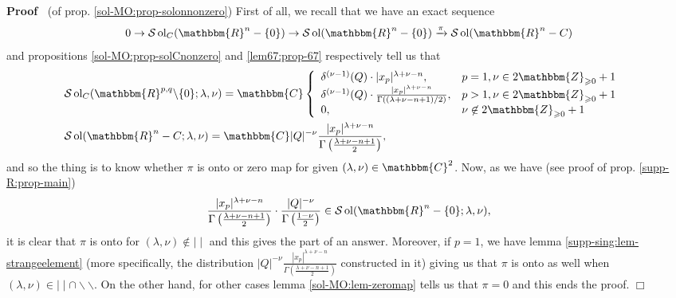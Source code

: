 \documentclass[12pt]{article}
\newcommand{\nin}{\not\in}
\newcommand{\tmop}[1]{\ensuremath{\operatorname{#1}}}
\renewenvironment{proof}{\noindent\textbf{Proof\ }}{\hspace*{\fill}$\Box$\medskip}
\theoremstyle{remark}
\begin{document}
\begin{proof}
  (of prop. \ref{sol-MO:prop-solonnonzero}) First of all, we recall that we
  have an exact sequence
  \[ 0 \rightarrow \mathcal{S} \tmop{ol}_C (\mathbbm{R}^n - \{ 0 \})
     \rightarrow \mathcal{S} \tmop{ol} (\mathbbm{R}^n - \{ 0 \})
     \xrightarrow{\pi} \mathcal{S} \tmop{ol} (\mathbbm{R}^n - C) \]
  and propositions \ref{sol-MO:prop-solCnonzero} and \ref{lem67:prop-67}
  respectively tell us that
  \begin{eqnarray}
    & \mathcal{S} \tmop{ol}_C (\mathbbm{R}^{p, q} \backslash \{ 0 \} ;
    \lambda, \nu) =\mathbbm{C} \left\{ \begin{array}{ll}
      \delta^{(\nu - 1)} (Q) \cdot | x_p |^{\lambda + \nu - n}, & p = 1, \nu
      \in 2\mathbbm{Z}_{\geqslant 0} + 1\\
      \delta^{(\nu - 1)} (Q) \cdot \frac{| x_p |^{\lambda + \nu - n}}{\Gamma
      ((\lambda + \nu - n + 1) / 2)}, & p > 1, \nu \in 2\mathbbm{Z}_{\geqslant
      0} + 1\\
      0, & \nu \nin 2\mathbbm{Z}_{\geqslant 0} + 1
    \end{array} \right. &  \nonumber\\
    & \mathcal{S} \tmop{ol} (\mathbbm{R}^n - C ; \lambda, \nu) =\mathbbm{C} |
    Q |^{- \nu} \frac{| x_p |^{\lambda + \nu - n}}{\Gamma \left( \frac{\lambda
    + \nu - n + 1}{2} \right)}, &  \nonumber
  \end{eqnarray}
  and so the thing is to know whether $\pi$ is onto or zero map for given
  $(\lambda, \nu) \in \mathbbm{C}^2$. Now, as we have (see proof of prop.
  \ref{supp-R:prop-main})
  \[ \frac{| x_p |^{\lambda + \nu - n}}{\Gamma \left( \frac{\lambda + \nu - n
     + 1}{2} \right)} \cdot \frac{| Q |^{- \nu}}{\Gamma \left( \frac{1 -
     \nu}{2} \right)} \in \mathcal{S} \tmop{ol} (\mathbbm{R}^n - \{ 0 \} ;
     \lambda, \nu), \]
  it is clear that $\pi$ is onto for $(\lambda, \nu) \nin \mid \mid$ and this
  gives the part of an answer. Moreover, if $p = 1$, we have lemma
  \ref{supp-sing:lem-strangeelement} (more specifically, the distribution $| Q
  |^{- \nu} \frac{| x_p |^{\lambda + \nu - n}}{\Gamma \left( \frac{\lambda +
  \nu - n + 1}{2} \right)}$ constructed in it) giving us that $\pi$ is onto as
  well when $(\lambda, \nu) \in \mid \mid \cap \backslash\backslash$. On the
  other hand, for other cases lemma \ref{sol-MO:lem-zeromap} tells us that
  $\pi = 0$ and this ends the proof.
\end{proof}
\end{document}
